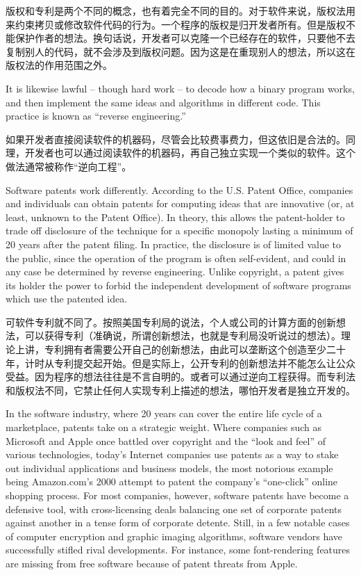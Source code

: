 \ifdefined\chs
版权和专利是两个不同的概念，也有着完全不同的目的。对于软件来说，版权法用来约束拷贝或修改软件代码的行为。一个程序的版权是归开发者所有。但是版权不能保护作者的想法。换句话说，开发者可以克隆一个已经存在的软件，只要他不去复制别人的代码，就不会涉及到版权问题。因为这是在重现别人的想法，所以这在版权法的作用范围之外。
\fi

\ifdefined\eng
It is likewise lawful -- though hard work -- to decode how a binary program works, and then implement the same ideas and algorithms in different code.  This practice is known as ``reverse engineering.''
\fi

\ifdefined\chs
如果开发者直接阅读软件的机器码，尽管会比较费事费力，但这依旧是合法的。同理，开发者也可以通过阅读软件的机器码，再自己独立实现一个类似的软件。这个做法通常被称作``逆向工程''。
\fi

\ifdefined\eng
Software patents work differently. According to the U.S. Patent Office, companies and individuals can obtain patents for computing ideas that are innovative (or, at least, unknown to the Patent Office). In theory, this allows the patent-holder to trade off disclosure of the technique for a specific monopoly lasting a minimum of 20 years after the patent filing. In practice, the disclosure is of limited value to the public, since the operation of the program is often self-evident, and could in any case be determined by reverse engineering. Unlike copyright, a patent gives its holder the power to forbid the independent development of software programs which use the patented idea.
\fi

\ifdefined\chs
可软件专利就不同了。按照美国专利局的说法，个人或公司的计算方面的创新想法，可以获得专利（准确说，所谓创新想法，也就是专利局没听说过的想法）。理论上讲，专利拥有者需要公开自己的创新想法，由此可以垄断这个创造至少二十年，计时从专利提交起开始。但是实际上，公开专利的创新想法并不能怎么让公众受益。因为程序的想法往往是不言自明的。或者可以通过逆向工程获得。而专利法和版权法不同，它禁止任何人实现专利上描述的想法，哪怕开发者是独立开发的。
\fi

\ifdefined\eng
In the software industry, where 20 years can cover the entire life cycle of a marketplace, patents take on a strategic weight. Where companies such as Microsoft and Apple once battled over copyright and the ``look and feel'' of various technologies, today's Internet companies use patents as a way to stake out individual applications and business models, the most notorious example being Amazon.com's 2000 attempt to patent the company's ``one-click'' online shopping process. For most companies, however, software patents have become a defensive tool, with cross-licensing deals balancing one set of corporate patents against another in a tense form of corporate detente. Still, in a few notable cases of computer encryption and graphic imaging algorithms, software vendors have successfully stifled rival developments.  For instance, some font-rendering features are missing from free software because of patent threats from Apple.
\fi

